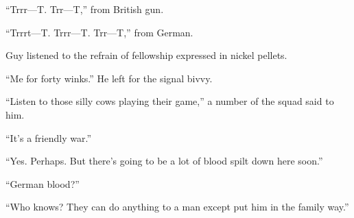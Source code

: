 ``Trrr---T. Trr---T,'' from British gun.

``Trrrt---T. Trrr---T. Trr---T,'' from German.

Guy listened to the refrain of fellowship expressed in nickel pellets.

``Me for forty winks.'' He left for the signal bivvy.

``Listen to those silly cows playing their game,'' a number of the squad said to him.

``It's a friendly war.''

``Yes. Perhaps. But there's going to be a lot of blood spilt down here soon.''

``German blood?''

``Who knows? They can do anything to a man except put him in the family way.''